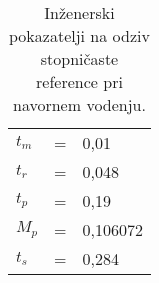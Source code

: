 \begin{table}[!h]
	\centering
	\begin{footnotesize}
		\begin{tabular}{|l c l|}
		\hline
		$ t_m $ & = & 0,01 \\
		$ t_r $ & = & 0,048 \\
		$ t_p $ & = & 0,19 \\
		$ M_p $ & = & 0,106072 \\
		$ t_s $ & = & 0,284 \\
		\hline
		\end{tabular}
	\end{footnotesize}
	\caption{In\v{z}enerski pokazatelji na odziv stopni\v{c}aste reference pri navornem vodenju.}
	\label{table:tq_step}
\end{table}